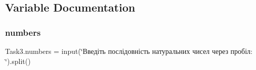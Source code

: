 \subsection{Variable Documentation}
\mbox{\label{namespace_task3_a42c2f8d5fca89733308e3c4d6b7eba36}} 
\subsubsection{\texorpdfstring{numbers}{numbers}}
{\footnotesize\ttfamily Task3.\+numbers = input(\char`\"{}Введіть послідовність натуральних чисел через пробіл\+: \char`\"{}).split()}

